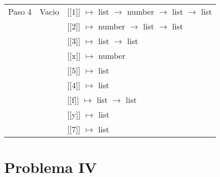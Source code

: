 \documentclass[12pt]{article}
\begin{document}
\begin{center}
\begin{longtable}{ | l | p{10 cm} | p{5 cm} | }
        Paso 4 &Vacio & [[$\boxed{1}$]] $\mapsto$ list $\rightarrow$ number $\rightarrow$ list $\rightarrow$ list \\
        & & [[$\boxed{2}$]] $\mapsto$ number $\rightarrow$ list $\rightarrow$ list \\
        & & [[$\boxed{3}$]] $\mapsto$ list $\rightarrow$ list \\
        & & [[x]] $\mapsto$ number \\
        & & [[$\boxed{5}$]] $\mapsto$ list \\
        & & [[$\boxed{4}$]] $\mapsto$ list \\
        & & [[f]] $\mapsto$ list $\rightarrow$ list \\
        & & [[y]] $\mapsto$ list \\
        & & [[$\boxed{7}$]] $\mapsto$ list \\
        \hline
    \end{longtable}
\end{center}


\section*{Problema IV}
\end{document}

